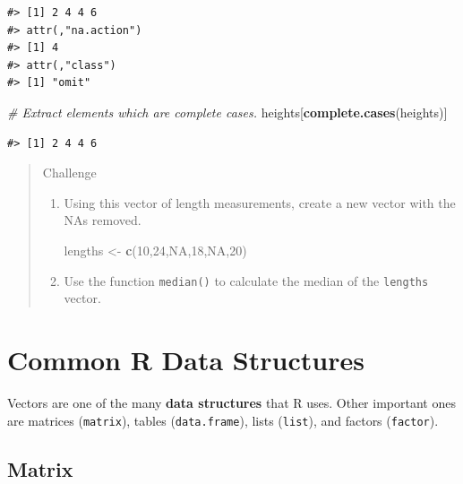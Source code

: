 \documentclass[]{book}
\newenvironment{Shaded}{\begin{snugshade}}{\end{snugshade}}
\newcommand{\KeywordTok}[1]{\textcolor[rgb]{0.13,0.29,0.53}{\textbf{#1}}}
\newcommand{\DecValTok}[1]{\textcolor[rgb]{0.00,0.00,0.81}{#1}}
\newcommand{\StringTok}[1]{\textcolor[rgb]{0.31,0.60,0.02}{#1}}
\newcommand{\CommentTok}[1]{\textcolor[rgb]{0.56,0.35,0.01}{\textit{#1}}}
\newcommand{\OtherTok}[1]{\textcolor[rgb]{0.56,0.35,0.01}{#1}}
\newcommand{\NormalTok}[1]{#1}
\theoremstyle{definition}
\theoremstyle{definition}
\theoremstyle{remark}
\begin{document}
\begin{verbatim}
#> [1] 2 4 4 6
#> attr(,"na.action")
#> [1] 4
#> attr(,"class")
#> [1] "omit"
\end{verbatim}

\begin{Shaded}
\begin{Highlighting}[]
\CommentTok{# Extract elements which are complete cases.}
\NormalTok{heights[}\KeywordTok{complete.cases}\NormalTok{(heights)]}
\end{Highlighting}
\end{Shaded}

\begin{verbatim}
#> [1] 2 4 4 6
\end{verbatim}

\begin{quote}
Challenge

\begin{enumerate}
\def\labelenumi{\arabic{enumi}.}
\item
  Using this vector of length measurements, create a new vector with the
  NAs removed.

\begin{Shaded}
\begin{Highlighting}[]
\NormalTok{lengths <-}\StringTok{ }\KeywordTok{c}\NormalTok{(}\DecValTok{10}\NormalTok{,}\DecValTok{24}\NormalTok{,}\OtherTok{NA}\NormalTok{,}\DecValTok{18}\NormalTok{,}\OtherTok{NA}\NormalTok{,}\DecValTok{20}\NormalTok{)}
\end{Highlighting}
\end{Shaded}
\item
  Use the function \texttt{median()} to calculate the median of the
  \texttt{lengths} vector.
\end{enumerate}
\end{quote}

\section{Common R Data Structures}\label{common-r-data-structures}

Vectors are one of the many \textbf{data structures} that R uses. Other
important ones are matrices (\texttt{matrix}), tables
(\texttt{data.frame}), lists (\texttt{list}), and factors
(\texttt{factor}).

\subsection{Matrix}\label{matrix}
\end{document}
